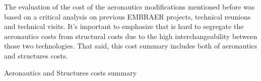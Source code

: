 ﻿%
The evaluation of the cost of the aeronautics modifications mentioned before was based on a critical analysis on previous EMBRAER projects, technical reunions and technical visits.
It's important to emphasize that is hard to segregate the aeronautics costs from structural costs due to the high interchangeability between those two technologies. That said, this cost summary includes both of aeronautics and structures costs.

\begin{table}[H]
\caption{Aeronautics and Structures costs summary}
\label{tab:aerostructcosts}
\end{table}